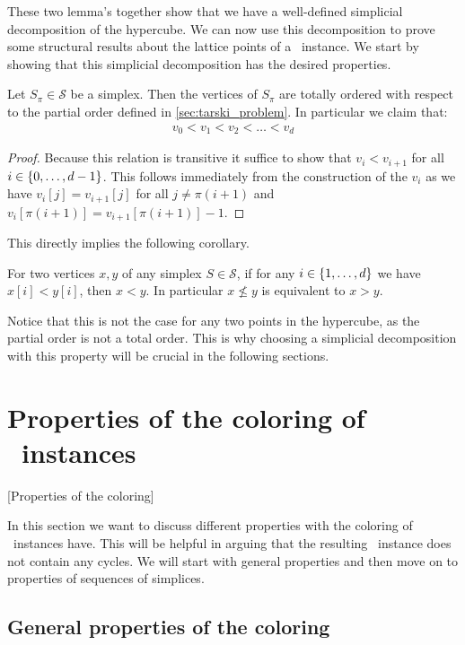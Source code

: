 These two lemma's together show that we have a well-defined simplicial decomposition of the hypercube. We can now use this decomposition to prove some structural results about the lattice points of a \Tarski\ instance. We start by showing that this simplicial decomposition has the desired properties.
\begin{lemma}
    Let $S_{\pi} \in \mathcal{S}$ be a simplex. Then the vertices of $S_{\pi}$ are totally ordered with respect to the partial order defined in \cref{sec:tarski_problem}. In particular we claim that:
    \begin{align*}
        v_0 < v_1 < v_2 < \dots < v_d
    \end{align*}
\end{lemma}
\begin{proof}
    Because this relation is transitive it suffice to show that $v_i < v_{i+1}$ for all $i \in \left\{0, \dots, d-1\right\}$. This follows immediately from the construction of the $v_i$ as we have $v_i[j] = v_{i+1}[j]$ for all $j \neq \pi(i+1)$ and $v_i[\pi(i+1)] = v_{i+1}[\pi(i+1)] - 1$.
\end{proof}
This directly implies the following corollary.
\begin{corollary}
    For two vertices $x,y$ of any simplex $S \in \mathcal{S}$, if for any $i \in \left\{1, \dots, d\right\}$ we have $x[i] < y[i]$, then $x < y$. In particular $x \not\leq y$ is equivalent to $x > y$.
\end{corollary}
Notice that this is not the case for any two points in the hypercube, as the partial order is not a total order. This is why choosing a simplicial decomposition with this property will be crucial in the following sections.

\section{Properties of the coloring of \Tarski\ instances}[Properties of the coloring]

In this section we want to discuss different properties with the coloring of \Tarski\ instances have. This will be helpful in arguing that the resulting \EndOfLine\ instance does not contain any cycles. We will start with general properties and then move on to properties of sequences of simplices.

\subsection{General properties of the coloring}

